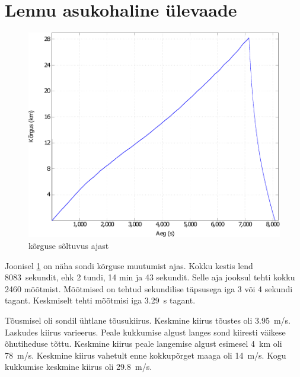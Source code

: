 \documentclass{trkut}%
\begin{document}
\section{Lennu asukohaline ülevaade}

\begin{figure}[h]
	\includegraphics[width=1\textwidth]{PicGra/kõraeg.pdf}
	\caption{kõrguse sõltuvus ajast}
	\label{kõraeg}
\end{figure}

Joonisel \ref{kõraeg} on näha sondi kõrguse muutumist ajas. Kokku kestis lend \SI{8083}{sekundit}, ehk 2 tundi, 14 min ja 43 sekundit. Selle aja jooksul tehti kokku 2460 mõõtmist. Mõõtmised on tehtud sekundilise täpsusega iga 3 või 4 sekundi tagant. Keskmiselt tehti mõõtmisi iga \SI{3.29}{s} tagant.

Tõusmisel oli sondil ühtlane tõusukiirus. Keskmine kiirus tõustes oli \SI{3.95}{m/s}. Laskudes kiirus varieerus. Peale kukkumise algust langes sond kiiresti väikese õhutiheduse tõttu. Keskmine kiirus peale langemise algust esimesel \SI{4}{km} oli \SI{78}{m/s}. Keskmine kiirus vahetult enne kokkupõrget maaga oli \SI{14}{m/s}. Kogu kukkumise keskmine kiirus oli \SI{29.8}{m/s}.
\end{document}
